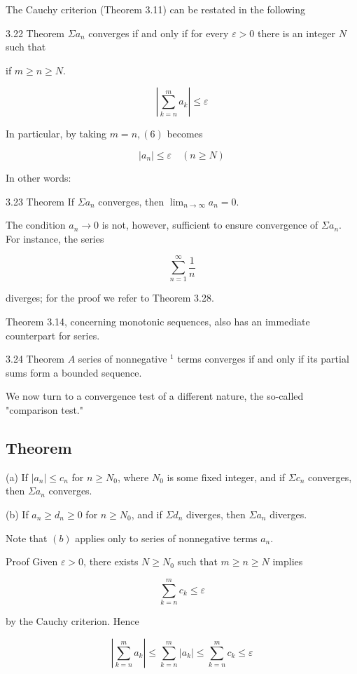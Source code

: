 \documentclass[10pt]{article}
\begin{document}
The Cauchy criterion (Theorem 3.11) can be restated in the following

3.22 Theorem $\Sigma a_{n}$ converges if and only if for every $\varepsilon>0$ there is an integer $N$ such that

if $m \geq n \geq N$.

$$
\left|\sum_{k=n}^{m} a_{k}\right| \leq \varepsilon
$$

In particular, by taking $m=n,(6)$ becomes

$$
\left|a_{n}\right| \leq \varepsilon \quad(n \geq N)
$$

In other words:

3.23 Theorem If $\Sigma a_{n}$ converges, then $\lim _{n \rightarrow \infty} a_{n}=0$.

The condition $a_{n} \rightarrow 0$ is not, however, sufficient to ensure convergence of $\Sigma a_{n}$. For instance, the series

$$
\sum_{n=1}^{\infty} \frac{1}{n}
$$

diverges; for the proof we refer to Theorem 3.28.

Theorem 3.14, concerning monotonic sequences, also has an immediate counterpart for series.

3.24 Theorem $A$ series of nonnegative ${ }^{1}$ terms converges if and only if its partial sums form a bounded sequence.

We now turn to a convergence test of a different nature, the so-called "comparison test."

\subsection{Theorem}
(a) If $\left|a_{n}\right| \leq c_{n}$ for $n \geq N_{0}$, where $N_{0}$ is some fixed integer, and if $\Sigma c_{n}$ converges, then $\Sigma a_{n}$ converges.

(b) If $a_{n} \geq d_{n} \geq 0$ for $n \geq N_{0}$, and if $\Sigma d_{n}$ diverges, then $\Sigma a_{n}$ diverges.

Note that $(b)$ applies only to series of nonnegative terms $a_{n}$.

Proof Given $\varepsilon>0$, there exists $N \geq N_{0}$ such that $m \geq n \geq N$ implies

$$
\sum_{k=n}^{m} c_{k} \leq \varepsilon
$$

by the Cauchy criterion. Hence

$$
\left|\sum_{k=n}^{m} a_{k}\right| \leq \sum_{k=n}^{m}\left|a_{k}\right| \leq \sum_{k=n}^{m} c_{k} \leq \varepsilon
$$
\end{document}
